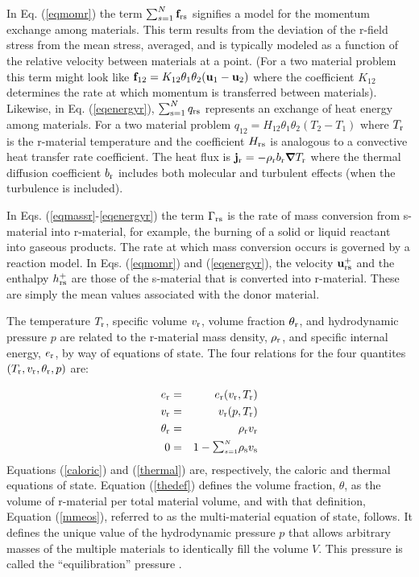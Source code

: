 In Eq. (\ref{eqmomr}) the term $\sum_{s=1}^{N}\bff_{\rmr\rms}$ signifies
a model for the momentum exchange among materials.  This term results from
the deviation of the r-field stress from the mean stress, averaged, and is
typically modeled as a function of the relative velocity between materials
at a point. (For a two material problem this term might look like $\bff_{12}
= K_{12}\theta_1\theta_2(\bfu_1 - \bfu_2)$ where the coefficient $K_{12}$
determines the rate at which momentum is transferred between materials).
Likewise, in Eq. (\ref{eqenergyr}), $\sum_{\rms=1}^{N} q_{\rmr\rms}$
represents an exchange of heat energy among materials.  For a two material
problem $q_{12} = H_{12}\theta_1\theta_2(T_2 - T_1)$ where $T_\rmr$ is the
r-material temperature and the coefficient $H_{\rmr\rms}$ is analogous to a
convective heat transfer rate coefficient.  The heat flux is $\bfj_\rmr =
-\rho_\rmr b_\rmr \bnabla T_\rmr$ where the thermal diffusion coefficient
$b_\rmr$ includes both molecular and turbulent effects (when the turbulence
is included).

In Eqs. (\ref{eqmassr}-\ref{eqenergyr}) the term $\Gamma_{\rmr\rms}$ is
the rate of mass conversion from s-material into r-material, for example,
the burning of a solid or liquid reactant into gaseous products.  The rate at which
mass conversion occurs is governed by a reaction model.  In Eqs. (\ref{eqmomr})
and (\ref{eqenergyr}), the velocity $\bfu_{\rmr\rms}^+$ and the enthalpy
$h_{\rmr\rms}^+$ are those of the s-material that is converted into r-material.
These are simply the mean values associated with the donor material.

The temperature $T_\rmr$, specific volume $v_\rmr$, volume fraction
$\theta_\rmr$, and hydrodynamic pressure $p$ are related to the r-material
mass density, $\rho_\rmr$, and specific internal energy, $e_\rmr$, by way
of equations of state.  The four relations for the four quantites $(T_\rmr,
v_\rmr, \theta_\rmr, p)$ are:

%
\begin{eqnarray}
e_\rmr &=& e_\rmr(v_\rmr, T_\rmr) \label{caloric} \\
v_\rmr &=& v_\rmr(p, T_\rmr) \label{thermal} \\
\theta_\rmr &=& \rho_\rmr v_\rmr \label{thedef} \\
0 &=& 1 - \SUM\rho_\rms v_\rms
\label{mmeos}
\end{eqnarray}
%
Equations (\ref{caloric}) and (\ref{thermal}) are, respectively, the caloric
and thermal equations of state.  Equation (\ref{thedef}) defines the volume
fraction, $\theta$, as the volume of r-material per total material volume,
and with that definition, Equation (\ref{mmeos}), referred to as the
multi-material equation of state, follows.  It defines the unique value of
the hydrodynamic pressure $p$ that allows arbitrary masses of the multiple
materials to identically fill the volume $V$.  This pressure is called the
``equilibration'' pressure \cite{kashiwaICE94}.

